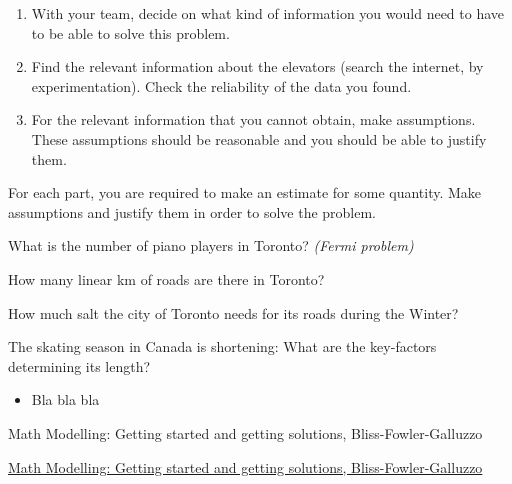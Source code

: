 \begin{enumerate} 

	\item With your team, decide on what kind of information you would need to have to be able to solve this problem.

	\item Find the relevant information about the elevators (search the internet, by experimentation). Check the reliability of the data you found.

	\item For the relevant information that you cannot obtain, make assumptions. These assumptions should be reasonable and you should be able to justify them.
\end{enumerate}


\vfill


\vfill

\question
For each part, you are required to make an estimate for some quantity. Make assumptions and justify them in order to solve the problem.
\begin{parts}
	\item What is the number of piano players in Toronto? \hfill \emph{(Fermi problem)}
	\item How many linear km of roads are there in Toronto?
	\item How much salt the city of Toronto needs for its roads during the Winter?
	\item The skating season in Canada is shortening: What are the key-factors determining its length?
	
\end{parts}












\begin{module}
	
	\begin{itemize}
		\item Bla bla bla	
	\end{itemize}
	

\begin{annotation}
	\begin{goals}
	Math Modelling: Getting started and getting solutions, Bliss-Fowler-Galluzzo
	
	\hfill {}	
	\end{goals}
\end{annotation}
	 \href{https://m3challenge.siam.org/resources/modeling-handbook}{Math Modelling: Getting started and getting solutions, Bliss-Fowler-Galluzzo}
\end{module}


